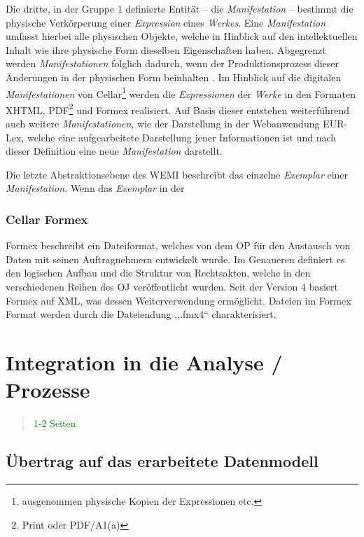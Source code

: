 Die dritte, in der Gruppe 1 definierte Entität -- die \textit{Manifestation} -- bestimmt die physische Verkörperung einer \textit{Expression} eines \textit{Werkes}.
Eine \textit{Manifestation} umfasst hierbei alle physischen Objekte, welche in Hinblick auf den intellektuellen Inhalt wie ihre physische Form dieselben Eigenschaften haben.
Abgegrenzt werden \textit{Manifestationen} folglich dadurch, wenn der Produktionsprozess dieser Änderungen in der physischen Form beinhalten \cite[S. 20f]{eu_frbr}.
Im Hinblick auf die digitalen \textit{Manifestationen} von Cellar\footnote{ausgenommen physische Kopien der Expressionen etc.} werden die \textit{Expressionen} der \textit{Werke} in den Formaten XHTML, PDF\footnote{Print oder PDF/A1(a)} und Formex realisiert. 
Auf Basis dieser entstehen weiterführend auch weitere \textit{Manifestationen}, wie der Darstellung in der Webanwendung EUR-Lex, welche eine aufgearbeitete Darstellung jener Informationen ist und nach dieser Definition eine neue \textit{Manifestation} darstellt.

Die letzte Abstraktionsebene des \acs{WEMI} beschreibt das einzelne \textit{Exemplar} einer \textit{Manifestation}.
Wenn das \textit{Exemplar} in der  

    \subsubsection{Cellar Formex}

Formex beschreibt ein Dateiformat, welches von dem \acf{OP} für den Austausch von Daten mit seinen Auftragnehmern entwickelt wurde.
Im Genaueren definiert es den logischen Aufbau und die Struktur von Rechtsakten, welche in den verschiedenen Reihen des \acf{OJ} veröffentlicht wurden.
Seit der Version 4 basiert Formex auf \ac{XML}, was dessen Weiterverwendung ermöglicht.
Dateien im Formex Format werden durch die Dateiendung ,,.fmx4`` charakterisiert. 
\cite[75]{eu_cellar}




        \pagebreak
    
    \section{Integration in die Analyse / Prozesse}
    
\begin{quote}
\textcolor{green}{1-2 Seiten}
\end{quote}

\subsection{Übertrag auf das erarbeitete Datenmodell}
\pagebreak